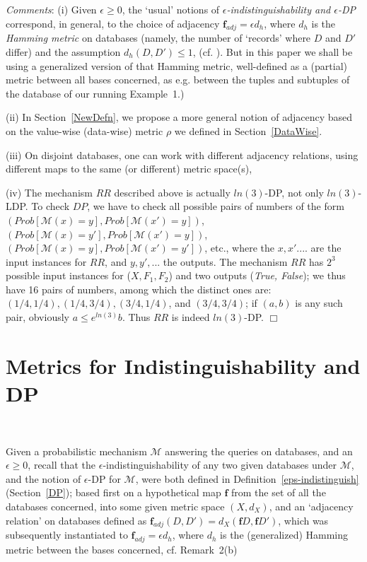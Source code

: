 \documentclass[pdflatex]{article}
\def \M {{\mathcal{M}}}
\def \lft {\noindent}
\newcommand{\brho}{\mathbf{f}}
\begin{document}
    \lft 
    {\em Comments}: (i) Given $\epsilon \ge 0$, the `usual' notions of {\em
      $\epsilon$-indistinguishability and $\epsilon$-DP} correspond, in general, to the
    choice of  adjacency $\brho_{adj} = \epsilon d_h$,  where $d_h$ is the
    {\em Hamming metric}  on databases (namely, the number of `records'
    where $D$ and $D'$   differ) and the assumption $d_h(D, D') \le 1$,
    (cf. \cite{dpMetrics2013}).  But in this paper we shall be using a  generalized
    version of that  Hamming metric, well-defined as a (partial) metric between
    all bases concerned, as e.g. between the tuples and subtuples  of the
    database of our running Example~1.) 

    (ii) In Section~\ref{NewDefn}, we propose a more general notion of adjacency 
    based on the value-wise (data-wise) metric $\rho$ we defined in Section~\ref{DataWise}. 
    
  (iii) On disjoint databases, one can work  with  different adjacency relations,  using
  different maps to the same (or different) metric  space(s), 

  (iv) The mechanism $RR$  described above is actually $ln(3)$-DP,  not only
  $ln(3)$-LDP. To check $DP$,   we have to
  check   all possible  pairs of numbers of the form  $(Prob[\M(x) = y], Prob[\M(x') = y])$, 
  $(Prob[\M(x) = y'], Prob[\M(x') = y])$,  $(Prob[\M(x) = y], Prob[\M(x') = y'])$, etc.,
  where   the $x, x'. ...$ are the input instances  for  $RR$, and   $y, y',
  ...$ the outputs.  The mechanism $RR$ has $2^3$ possible input instances for
  ($X, F_1, F_2$) and two  outputs ({\em  True, False}); we thus have 16   pairs of
  numbers, among which the distinct ones are: $(1/4, 1/4), (1/4, 3/4),  (3/4,  1/4)$, 
  and $(3/4, 3/4)$;  if  $(a, b)$ is   any such pair, obviously $a  \le  e^{ln(3)} b$.
  Thus $RR$ is indeed $ln(3)$-DP.    \hfill$\Box$

\vspace*{-1em}
 \section{{\large Metrics for Indistinguishability and DP}}~\label{NewDefn}
\vspace*{-1.5em}

Given a probabilistic mechanism $\M$ answering the queries on  databases,
and an $\epsilon \ge 0$, recall that the   $\epsilon$-indistinguishability  of any two given
databases under $\M$, and  the notion  of $\epsilon$-DP for  $\M$,  were both defined 
in Definition~\ref{eps-indistinguish} (Section~\ref{DP}); based first on  a
 hypothetical map $\brho$ from the set of all the databases concerned, into some
  given  metric space $(X, d_X)$, and an `adjacency relation' on databases defined as
$ \brho_{adj}(D, D') = d_X(\brho D, \brho D')$,  which was  subsequently instantiated to
  $\brho_{adj} = \epsilon d_h$, where $d_h$ is the (generalized) Hamming metric between
  the bases concerned,  cf. Remark~2(b)
  
\end{document}
